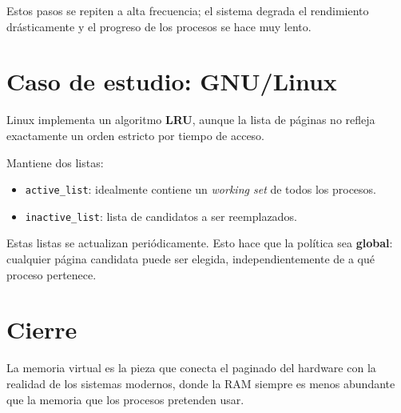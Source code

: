 \documentclass[11pt,a4paper]{article}
\begin{document}
Estos pasos se repiten a alta frecuencia; el sistema degrada el
rendimiento drásticamente y el progreso de los procesos se hace muy
lento.

\section{Caso de estudio: GNU/Linux}
\label{sec:linux-mv}

Linux implementa un algoritmo \textbf{LRU}, aunque la lista de páginas
no refleja exactamente un orden estricto por tiempo de acceso.

Mantiene dos listas:

\begin{itemize}[leftmargin=*]
    \item \texttt{active\_list}: idealmente contiene un \emph{working
        set} de todos los procesos.
    \item \texttt{inactive\_list}: lista de candidatos a ser
        reemplazados.
\end{itemize}

Estas listas se actualizan periódicamente. Esto hace que la política
sea \textbf{global}: cualquier página candidata puede ser elegida,
independientemente de a qué proceso pertenece.

\section{Cierre}

La memoria virtual es la pieza que conecta el paginado del hardware con
la realidad de los sistemas modernos, donde la RAM siempre es menos
abundante que la memoria que los procesos pretenden usar.
\end{document}

